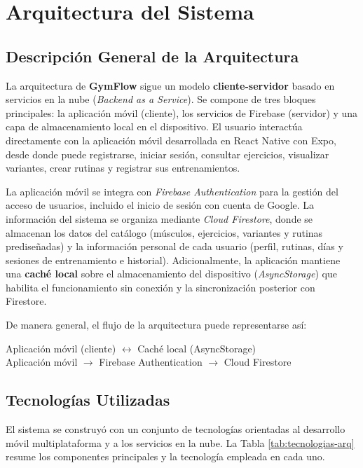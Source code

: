 \section{Arquitectura del Sistema}

\subsection{Descripción General de la Arquitectura}

La arquitectura de \textbf{GymFlow} sigue un modelo \textbf{cliente-servidor} basado en servicios en la nube (\textit{Backend as a Service}). Se compone de tres bloques principales: la aplicación móvil (cliente), los servicios de Firebase (servidor) y una capa de almacenamiento local en el dispositivo. El usuario interactúa directamente con la aplicación móvil desarrollada en React Native con Expo, desde donde puede registrarse, iniciar sesión, consultar ejercicios, visualizar variantes, crear rutinas y registrar sus entrenamientos.

La aplicación móvil se integra con \textit{Firebase Authentication} para la gestión del acceso de usuarios, incluido el inicio de sesión con cuenta de Google. La información del sistema se organiza mediante \textit{Cloud Firestore}, donde se almacenan los datos del catálogo (músculos, ejercicios, variantes y rutinas prediseñadas) y la información personal de cada usuario (perfil, rutinas, días y sesiones de entrenamiento e historial). Adicionalmente, la aplicación mantiene una \textbf{caché local} sobre el almacenamiento del dispositivo (\textit{AsyncStorage}) que habilita el funcionamiento sin conexión y la sincronización posterior con Firestore.

De manera general, el flujo de la arquitectura puede representarse así:

\begin{center}
Aplicación móvil (cliente) $\leftrightarrow$ Caché local (AsyncStorage) \\[4pt]
Aplicación móvil $\rightarrow$ Firebase Authentication $\rightarrow$ Cloud Firestore
\end{center}

\subsection{Tecnologías Utilizadas}

El sistema se construyó con un conjunto de tecnologías orientadas al desarrollo móvil multiplataforma y a los servicios en la nube. La Tabla \ref{tab:tecnologias-arq} resume los componentes principales y la tecnología empleada en cada uno.

